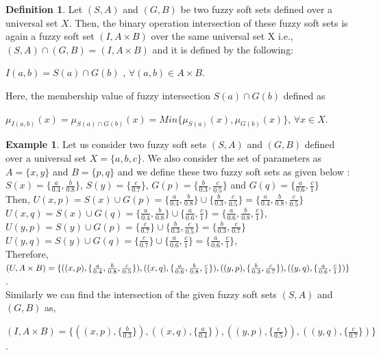 \documentclass{article}
\theoremstyle{definition}
\newtheorem{definition}{Definition}[section]
\newtheorem{example}{Example}[section]
\begin{document}
\begin{definition}
     Let $(S, A)$ and $(G,B)$ be two fuzzy soft sets defined over a universal set $X$. Then, the binary operation intersection of these fuzzy soft sets is again a fuzzy soft set $(I, A \times B)$ over the same universal set X i.e., $(S,A) \cap (G,B)=(I, A\times B)$ and it is defined by the following:

    $I(a, b)=S(a)\cap G(b)$ , $\forall (a ,b) \in A\times B$.

    Here, the membership value of fuzzy intersection $S(a)\cap G(b)$ defined as

    $\mu_{I(a,b)}(x) = \mu_{S(a)\cap G(b)}(x) = Min\{\mu_{S(a)}(x), \mu_{G(b)}(x)\}$, $\forall x\in X$.
\end{definition}
\begin{example}
    Let us consider two fuzzy soft sets $(S, A)$ and $(G, B)$ defined over a  universal set $X=\{a, b, c\}$. We also consider the set of parameters as $A=\{x, y\}$ and $B=\{p, q\}$ and we define these two fuzzy soft sets as given below : \\

    $S(x)=\{\frac{a}{0.4}, \frac{b}{0.8}\}$, $S(y)=\{\frac{c}{0.7}\}$, $G(p)=\{\frac{b}{0.3}, \frac{c}{0.5}\}$ and $G(q)=\{\frac{a}{0.6}, \frac{c}{1}\}$\\

    Then, $U(x, p)= S(x) \cup G(p)= \{\frac{a}{0.4}, \frac{b}{0.8}\} \cup \{\frac{b}{0.3}, \frac{c}{0.5}\} = \{\frac{a}{0.4}, \frac{b}{0.8}, \frac{c}{0.5}\}$\\

     $U(x, q)= S(x) \cup G(q)= \{\frac{a}{0.4}, \frac{b}{0.8}\} \cup \{\frac{a}{0.6}, \frac{c}{1}\} = \{\frac{a}{0.6}, \frac{b}{0.8}, \frac{c}{1}\}$,\\

     $U(y, p)= S(y) \cup G(p)= \{ \frac{c}{0.7}\} \cup \{\frac{b}{0.3}, \frac{c}{0.5}\} = \{\frac{b}{0.3}, \frac{c}{0.7}\}$\\

      $U(y, q)= S(y) \cup G(q)= \{\frac{c}{0.7}\} \cup \{\frac{a}{0.6}, \frac{c}{1}\} = \{\frac{a}{0.6}, \frac{c}{1}\}$,\\

      Therefore, $(U, A\times B)=\{((x, p), \{\frac{a}{0.4}, \frac{b}{0.8}, \frac{c}{0.5}\}), ((x, q), \{\frac{a}{0.6}, \frac{b}{0.8}, \frac{c}{1}\}),\\ ((y,p), \{\frac{b}{0.3}, \frac{c}{0.7}\}), ((y, q), \{\frac{a}{0.6}, \frac{c}{1}\})\}$.\\

      Similarly we can find the intersection of the given fuzzy soft sets $(S, A)$ and $(G, B)$ as,

      $(I, A\times B)=\{((x, p), \{ \frac{b}{0.3}\}), ((x, q), \{\frac{a}{0.4}\}), ((y,p), \{ \frac{c}{0.5}\}), ((y, q), \{ \frac{c}{0.7}\})\}$.
\end{example}
\end{document}
